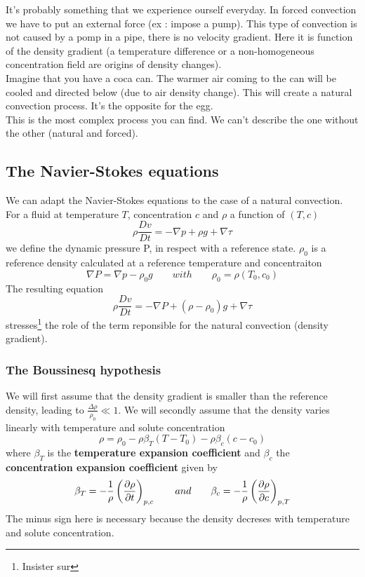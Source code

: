 		It's probably something that we experience ourself everyday. In forced convection we have to put an external force (ex : impose a pump). This type of convection is not caused by a pomp in a pipe, there is no velocity gradient. Here it is function of the density gradient (a temperature difference or a non-homogeneous concentration field are origins of density changes).\\ 
Imagine that you have a coca can. The warmer air coming to the can will be cooled and directed below (due to air density change). This will create a natural convection process. It’s the opposite for the egg. \\
This is the most complex process you can find. We can’t describe the one without the other (natural and forced).\\

	\subsection{The Navier-Stokes equations}
		We can adapt the Navier-Stokes equations to the case of a natural convection. For a fluid at temperature $T$, concentration $c$ and $\rho$ a function of $(T,c)$
		\begin{equation}
			\rho \frac{D v}{D t} = -\nabla p + \rho g + \nabla \tau
		\end{equation}
		we define the dynamic pressure P, in respect with a reference state. $\rho _0$ is a reference density calculated at a reference temperature and concentraiton
		\begin{equation}
			\nabla P = \nabla p - \rho _0 g \qquad with \qquad \rho _ 0 = \rho (T_0,c_0)
		\end{equation}
		The resulting equation
		\begin{equation}
			\rho \frac{D v}{D t} = -\nabla P + (\rho - \rho _0) g + \nabla \tau
		\end{equation}		 
		stresses\footnote{Insister sur} the role of the term reponsible for the natural convection (density gradient). 

		\subsubsection{The Boussinesq hypothesis}
			We will first assume that the density gradient is smaller than the reference density, leading to $\frac{\Delta \rho }{\rho _0} \ll 1$. 
			We will secondly assume that the density varies linearly with temperature and solute concentration 
			\begin{equation}
				\rho = \rho _0 - \rho \beta _T (T-T_0) - \rho \beta _c (c-c_0)
			\end{equation}
			where $\beta _T$ is the \textbf{temperature expansion coefficient} and $\beta _c$ the \textbf{concentration expansion coefficient} given by 
			\begin{equation}
				\beta _T = - \frac{1}{\rho} \left( \frac{\D \rho}{\D t} \right) _{p,c} \qquad and \qquad \beta _c = - \frac{1}{\rho} \left( \frac{\D \rho}{\D c} \right) _{p,T}
			\end{equation}
			The minus sign here is necessary because the density decreses with temperature and solute concentration. 
			
